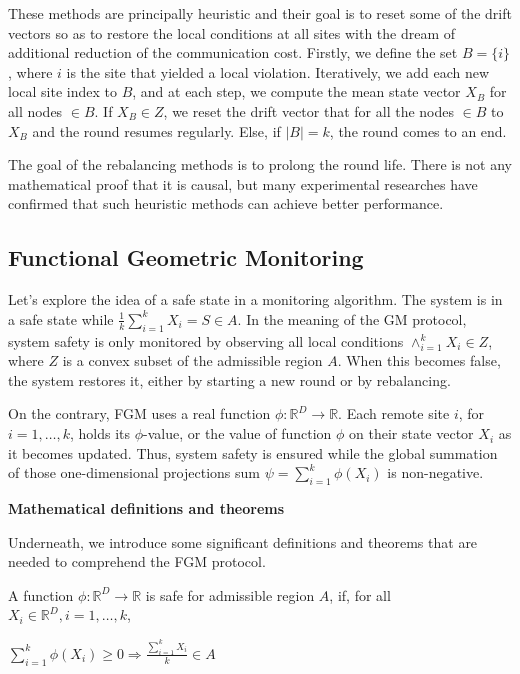 These methods are principally heuristic and their goal is to reset some of the drift vectors so as to restore the local conditions at all sites with the dream of additional reduction of the communication cost.
Firstly, we define the set $B = \{i\}$, where $i$ is the site that yielded a local violation.
Iteratively, we add each new local site index to $B$, and at each step, we compute the mean state vector $X_B$  for all nodes $\in B$.
If $X_B \in Z$, we reset the drift vector that for all the nodes $\in B$ to $X_B$ and the round resumes regularly.
Else, if $|B| = k$, the round comes to an end.


The goal of the rebalancing methods is to prolong the round life.
There is not any mathematical proof that it is causal, but many experimental researches have confirmed that such heuristic methods can achieve better performance.

\subsection{Functional Geometric Monitoring}\label{subsec:functional-geometric-monitoring}

Let's explore the idea of a safe state in a monitoring algorithm.
The system is in a safe state while $\frac{1}{k} \sum_{i=1}^{k} X_i = S \in A$.
In the meaning of the GM protocol, system safety is only monitored by observing all local conditions $\land_{i=1}^k X_i \in Z$, where $Z$ is a convex subset of the admissible region $A$\@.
When this becomes false, the system restores it, either by starting a new round or by rebalancing.

On the contrary, FGM uses a real function $\phi : \mathbb{R}^D \rightarrow \mathbb{R}$.
Each remote site $i$, for $i = 1, \dots , k$, holds its $\phi$-value, or the value of function $\phi$ on their state vector $X_i$ as it becomes updated.
Thus, system safety is ensured while the global summation of those one-dimensional projections sum $ \psi = \sum_{i=1}^{k} \phi(X_i)$ is non-negative.


{\large \textbf{Mathematical definitions and theorems}}

Underneath, we introduce some significant definitions and theorems that are needed to comprehend the FGM protocol.

\begin{definition}
    A function $\phi : \mathbb{R}^D \rightarrow \mathbb{R}$ is safe for admissible region $A$, if, for all $X_i \in \mathbb{R}^D, i = 1, \dots, k$,
    \begin{center}
        $\sum_{i=1}^{k} \phi(X_i) \geq 0 \Rightarrow \frac{\sum_{i=1}^{k} X_i}{k} \in A$
    \end{center}

\end{definition}

